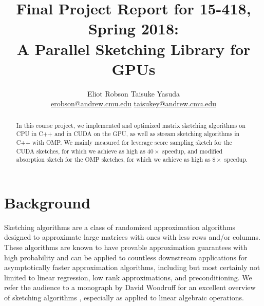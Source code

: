 \documentclass[12pt]{article}
\begin{document}
\title{
    \normalsize Final Project Report for 15-418, Spring 2018: \\
    \LARGE A Parallel Sketching Library for GPUs
}
\author{Eliot Robson \qquad Taisuke Yasuda\\ \small
\href{mailto:erobson@andrew.cmu.edu}{erobson@andrew.cmu.edu} \quad \href{mailto:taisukey@andrew.cmu.edu}{taisukey@andrew.cmu.edu}}

\maketitle

\begin{abstract}
	In this course project, we implemented and optimized matrix sketching algorithms on CPU in C++ and in CUDA on the GPU, as well as stream sketching algorithms in C++ with OMP. We mainly measured for leverage score sampling sketch for the CUDA sketches, for which we achieve as high as $40\times$ speedup, and modified absorption sketch for the OMP sketches, for which we achieve as high as $8\times$ speedup.
\end{abstract}

\section{Background}
Sketching algorithms are a class of randomized approximation algorithms designed to approximate large matrices with ones with less rows and/or columns. These algorithms are known to have provable approximation guarantees with high probability and can be applied to countless downstream applications for asymptotically faster approximation algorithms, including but most certainly not limited to linear regression, low rank approximations, and preconditioning. We refer the audience to a monograph by David Woodruff for an excellent overview of sketching algorithms \cite{woodruff2014sketching}, especially as applied to linear algebraic operations.
\end{document}
